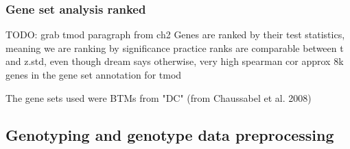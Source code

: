 \begin{outline}
\subsubsection{Gene set analysis ranked}

\1 TODO: grab tmod paragraph from ch2
    \2 Genes are ranked by their test statistics, meaning we are ranking by significance
        \3 practice ranks are comparable between t and z.std, even though dream says otherwise, very high spearman cor
    \2 approx 8k genes in the gene set annotation for tmod

The gene sets used were \glspl{BTM} from\autocite{li2013MolecularSignaturesAntibody}
"DC" (from Chaussabel et al. 2008)

\subsection{Genotyping and genotype data preprocessing}

%
%
%
%


\end{outline}
